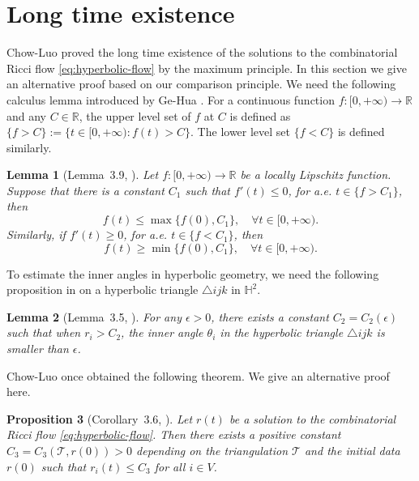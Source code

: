 \documentclass[12pt]{amsart}
\numberwithin{equation}{section}
\newtheorem{prop}{Proposition}[section]
\newtheorem{lem}[prop]{Lemma}
\begin{document}
\section{Long time existence}\label{sec:longtime}

Chow-Luo \cite{ChowLuo} proved the long time existence of the solutions to the combinatorial Ricci flow \eqref{eq:hyperbolic-flow} by
the maximum principle. In this section we give an alternative proof based on our comparison principle. We
need the following calculus lemma introduced by Ge-Hua \cite{GeHua}. For a continuous function $f: [0,+\infty) \to \mathbb{R}$
and any $C \in \mathbb{R}$, the upper level set of $f$ at $C$ is defined as $\{f > C\} := \{t \in [0,+\infty) : f(t) > C\}$. The
lower level set $\{f < C\}$ is defined similarly.

\begin{lem}[Lemma~3.9, \cite{GeHua}]\label{lem:6.1}
Let $f: [0,+\infty) \to \mathbb{R}$ be a locally Lipschitz function. Suppose that
there is a constant $C_1$ such that $f'(t) \leq 0$, for a.e. $t \in \{f > C_1\}$, then
\[
f(t) \leq \max\{f(0), C_1\}, \quad \forall t \in [0,+\infty).
\]
Similarly, if $f'(t) \geq 0$, for a.e. $t \in \{f < C_1\}$, then
\[
f(t) \geq \min\{f(0), C_1\}, \quad \forall t \in [0,+\infty).
\]
\end{lem}

To estimate the inner angles in hyperbolic geometry, we need the following proposition in \cite{ChowLuo} on a
hyperbolic triangle $\triangle ijk$ in $\mathbb{H}^2$.

\begin{lem}[Lemma~3.5, \cite{ChowLuo}]\label{lem:6.2}
For any $\epsilon > 0$, there exists a constant $C_2 = C_2(\epsilon)$ such that when
$r_i > C_2$, the inner angle $\theta_i$ in the hyperbolic triangle $\triangle ijk$ is smaller than $\epsilon$.
\end{lem}

Chow-Luo \cite{ChowLuo} once obtained the following theorem. We give an alternative proof here.

\begin{prop}[Corollary~3.6, \cite{ChowLuo}]\label{prop:6.3}
Let $r(t)$ be a solution to the combinatorial Ricci flow \eqref{eq:hyperbolic-flow}. Then
there exists a positive constant $C_3 = C_3(\mathcal{T}, r(0)) > 0$ depending on the triangulation $\mathcal{T}$ and the initial
data $r(0)$ such that $r_i(t) \leq C_3$ for all $i \in V$.
\end{prop}
\end{document}
